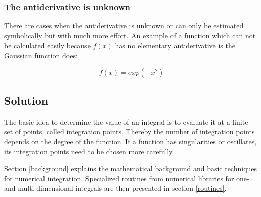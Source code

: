 \subsubsection{The antiderivative is unknown}
There are cases when the antiderivative is unknown or can only be estimated symbolically but with much more effort. An example of a function which can not be calculated easily because $f(x)$ has no elementary antiderivative is the Gaussian function does:

\begin{equation} 	 	
f(x) = exp(-x^2) 
\end{equation}



\subsection{Solution}
The basic idea to determine the value of an integral is to evaluate it at a finite set of points, called integration points. Thereby the number of integration points depends on the degree of the function. If a function has singularities or oscillates, its integration points need to be chosen more carefully.

Section \ref{background} explains the mathematical background and basic techniques for numerical integration. Specialized routines from numerical libraries for one- and multi-dimensional integrals are then presented in section \ref{routines}.



\nocite{Coleman1977}
\nocite{Gautschi1995}
\nocite{GermundDahlquist2009}

